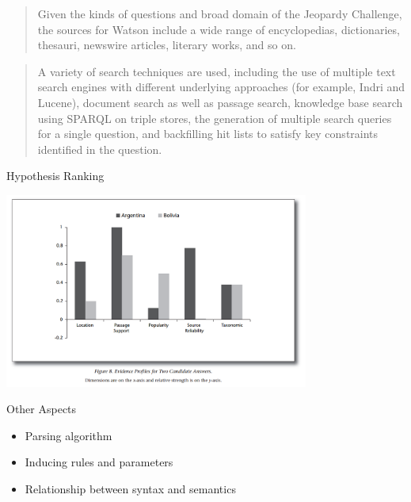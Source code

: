 \documentclass{beamer}
\begin{document}
\begin{frame}
  \begin{quote}
    Given the kinds of questions and broad domain of the Jeopardy
    Challenge, the sources for Watson include a wide range of
    encyclopedias, dictionaries, thesauri, newswire articles, literary
    works, and so on.
  \end{quote}
\end{frame}

\begin{frame}
  \begin{quote}
    A variety of search techniques are used, including the use of
    multiple text search engines with different underlying approaches
    (for example, Indri and Lucene), document search as well as
    passage search, knowledge base search using SPARQL on triple
    stores, the generation of multiple search queries for a single
    question, and backfilling hit lists to satisfy key constraints
    identified in the question.
  \end{quote}
\end{frame}

\begin{frame}{Hypothesis Ranking}
  \begin{center}
    \includegraphics[width=10cm]{deepqaanalysis}
  \end{center}
\end{frame}

\begin{frame}{Other Aspects}
  \begin{itemize}
  \item Parsing algorithm
    \air 
  \item Inducing rules and parameters
    \air 
  \item Relationship between syntax and semantics
  \end{itemize}
\end{frame}

{

}
\end{document}
